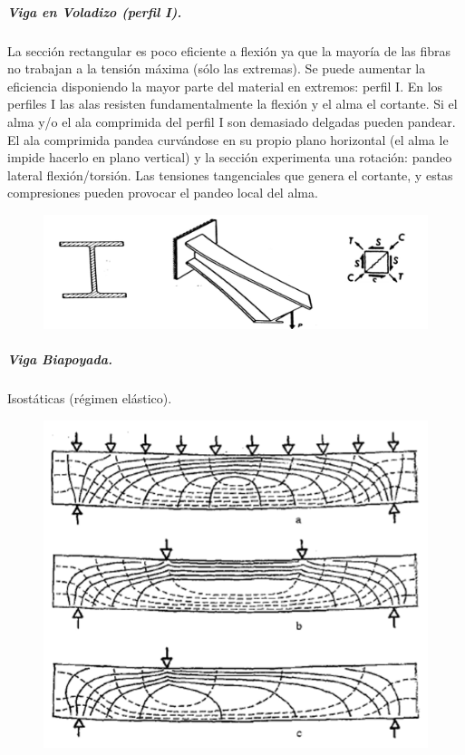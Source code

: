 \subparagraph{Viga en Voladizo (perfil I).}
La sección rectangular es poco eficiente a flexión ya que la mayoría de las fibras no trabajan a la tensión máxima (sólo las extremas). Se puede aumentar la eficiencia disponiendo la mayor parte del material en extremos: perfil I. En los perfiles I las alas resisten fundamentalmente la flexión y el alma el cortante. Si el alma y/o el ala comprimida del perfil I son demasiado delgadas pueden pandear. El ala comprimida pandea curvándose en su propio plano horizontal (el alma le impide hacerlo en plano vertical) y la sección experimenta una rotación: pandeo lateral flexión/torsión. Las tensiones tangenciales que genera el cortante, y estas compresiones pueden provocar el pandeo local del alma.
\begin{figure}[H]
    \centering
    \includegraphics[width=\linewidth]{Imagenes/Viga en voladizo perfil I.png}
\end{figure}

\subparagraph{Viga Biapoyada.}
Isostáticas (régimen elástico).
\begin{figure}[H]
    \centering
    \includegraphics[width=0.75\linewidth]{Imagenes/Viga Biapoyada - Isostaticas.png}
\end{figure}

